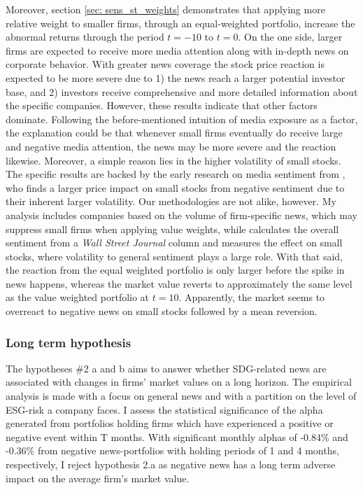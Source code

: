 Moreover, section \ref{sec: sens_st_weights} demonstrates that applying more relative weight to smaller firms, through an equal-weighted portfolio, increase the abnormal returns through the period $t = -10$ to $t = 0$. On the one side, larger firms are expected to receive more media attention along with in-depth news on corporate behavior. With greater news coverage the stock price reaction is expected to be more severe due to 1) the news reach a larger potential investor base, and 2) investors receive comprehensive and more detailed information about the specific companies. However, these results indicate that other factors dominate. Following the before-mentioned intuition of media exposure as a factor, the explanation could be that whenever small firms eventually do receive large and negative media attention, the news may be more severe and the reaction likewise. Moreover, a simple reason lies in the higher volatility of small stocks. The specific results are backed by the early research on media sentiment from \cite{tetlock_sentiment}, who finds a larger price impact on small stocks from negative sentiment due to their inherent larger volatility. Our methodologies are not alike, however. My analysis includes companies based on the volume of firm-specific news, which may suppress small firms when applying value weights, while \citeauthor{tetlock_sentiment} calculates the overall sentiment from a \textit{Wall Street Journal} column and measures the effect on small stocks, where volatility to general sentiment plays a large role. With that said, the reaction from the equal weighted portfolio is only larger before the spike in news happens, whereas the market value reverts to approximately the same level as the value weighted portfolio at $t = 10$. Apparently, the market seems to overreact to negative news on small stocks followed by a mean reversion.  

\subsubsection{Long term hypothesis}

The hypotheses \#2 a and b aims to answer whether SDG-related news are associated with changes in firms' market values on a long horizon. The empirical analysis is made with a focus on general news and with a partition on the level of ESG-risk a company faces. I assess the statistical significance of the alpha generated from portfolios holding firms which have experienced a positive or negative event within T months. With significant monthly alphas of -0.84\% and -0.36\% from negative news-portfolios with holding periods of 1 and 4 months, respectively, I reject hypothesis 2.a as negative news has a long term adverse impact on the average firm's market value.   

